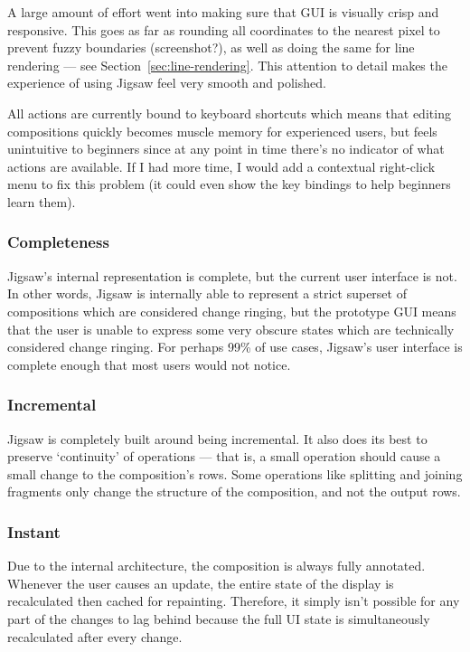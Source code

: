 \documentclass[12pt]{article}
\begin{document}
A large amount of effort went into making sure that GUI is visually crisp and responsive.  This
goes as far as rounding all coordinates to the nearest pixel to prevent fuzzy boundaries
(screenshot?), as well as doing the same for line rendering --- see
Section~\ref{sec:line-rendering}.  This attention to detail makes the experience of using Jigsaw
feel very smooth and polished.

All actions are currently bound to keyboard shortcuts which means that editing compositions quickly
becomes muscle memory for experienced users, but feels unintuitive to beginners since at any point
in time there's no indicator of what actions are available.  If I had more time, I would add a
contextual right-click menu to fix this problem (it could even show the key bindings to help
beginners learn them).

\subsubsection{Completeness}

Jigsaw's internal representation is complete, but the current user interface is not.  In other
words, Jigsaw is internally able to represent a strict superset of compositions which are considered
change ringing, but the prototype GUI means that the user is unable to express some very obscure
states which are technically considered change ringing.  For perhaps 99\% of use cases, Jigsaw's
user interface is complete enough that most users would not notice.

\subsubsection{Incremental}

Jigsaw is completely built around being incremental.  It also does its best to preserve `continuity'
of operations --- that is, a small operation should cause a small change to the composition's rows.
Some operations like splitting and joining fragments only change the structure of the composition,
and not the output rows.

\subsubsection{Instant}

Due to the internal architecture, the composition is always fully annotated.  Whenever the user
causes an update, the entire state of the display is recalculated then cached for repainting.
Therefore, it simply isn't possible for any part of the changes to lag behind because the full UI
state is simultaneously recalculated after every change.
\end{document}
